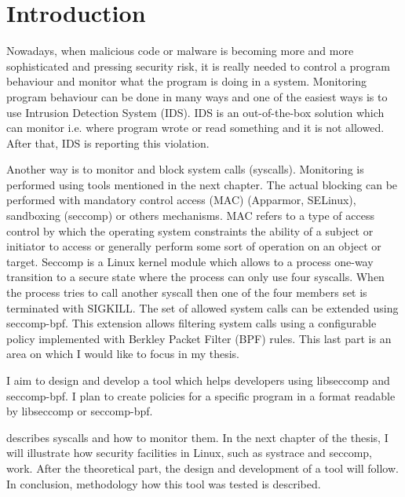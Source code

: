 


\chapter{Introduction}
Nowadays, when malicious code or malware is becoming more and more sophisticated and pressing security risk, it is really needed to control a program behaviour and monitor what the program is doing in a system.
Monitoring program behaviour can be done in many ways and one of the easiest ways is to use Intrusion Detection System (IDS).
IDS is an out-of-the-box solution which can monitor i.e. where program wrote or read something and it is not allowed.
After that, IDS is reporting this violation.

Another way is to monitor and block system calls (syscalls).
Monitoring is performed using tools mentioned in the next chapter.
The actual blocking can be performed with mandatory control access (MAC) (Apparmor, SELinux), sandboxing (seccomp) or others mechanisms.
MAC refers to a type of access control by which the operating system constraints the ability of a subject or initiator to access or generally perform some sort of operation on an object or target.
Seccomp is a Linux kernel module which allows to a process one-way transition to a secure state where the process can only use four syscalls.
When the process tries to call another syscall then one of the four members set is terminated with SIGKILL.
The set of allowed system calls can be extended using seccomp-bpf.
This extension allows filtering system calls using a configurable policy implemented with Berkley Packet Filter (BPF) rules.
This last part is an area on which I would like to focus in my thesis.

I aim to design and develop a tool which helps developers using libseccomp and seccomp-bpf.
I plan to create policies for a specific program in a format readable by libseccomp or seccomp-bpf.

 describes syscalls and how to monitor them.
In the next chapter of the thesis, I will illustrate how security facilities in Linux, such as systrace and seccomp, work.
After the theoretical part, the design and development of a tool will follow.
In conclusion, methodology how this tool was tested is described.

